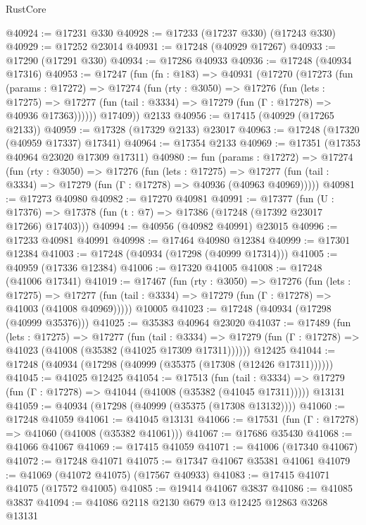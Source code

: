 \begin{lexlean}{RustCore}
\begin{coremodule}
@40924 := @17231 @330
@40928 := @17233 (@17237 @330) (@17243 @330)
@40929 := @17252 @23014
@40931 := @17248 (@40929 @17267)
@40933 := @17290 (@17291 @330)
@40934 := @17286 @40933
@40936 := @17248 (@40934 @17316)
@40953 := @17247
    (fun (fn : @183) =>
    @40931
      (@17270
        (@17273
          (fun (params : @17272) =>
          @17274
            (fun (rty : @3050) =>
            @17276
              (fun (lets : @17275) =>
              @17277 (fun (tail : @3334) => @17279 (fun (Γ : @17278) => @40936 @17363))))))
        @17409))
    @2133
@40956 := @17415 (@40929 (@17265 @2133))
@40959 := @17328 (@17329 @2133) @23017
@40963 := @17248 (@17320 (@40959 @17337) @17341)
@40964 := @17354 @2133
@40969 := @17351 (@17353 @40964 @23020 @17309 @17311)
@40980 := fun (params : @17272) =>
  @17274
    (fun (rty : @3050) =>
    @17276
      (fun (lets : @17275) =>
      @17277 (fun (tail : @3334) => @17279 (fun (Γ : @17278) => @40936 (@40963 @40969)))))
@40981 := @17273 @40980
@40982 := @17270 @40981
@40991 := @17377
    (fun (U : @17376) => @17378 (fun (t : @7) => @17386 (@17248 (@17392 @23017 @17266) @17403)))
@40994 := @40956 (@40982 @40991) @23015
@40996 := @17233 @40981 @40991
@40998 := @17464 @40980 @12384
@40999 := @17301 @12384
@41003 := @17248 (@40934 (@17298 (@40999 @17314)))
@41005 := @40959 (@17336 @12384)
@41006 := @17320 @41005
@41008 := @17248 (@41006 @17341)
@41019 := @17467
    (fun (rty : @3050) =>
    @17276
      (fun (lets : @17275) =>
      @17277 (fun (tail : @3334) => @17279 (fun (Γ : @17278) => @41003 (@41008 @40969)))))
    @10005
@41023 := @17248 (@40934 (@17298 (@40999 @35376)))
@41025 := @35383 @40964 @23020
@41037 := @17489
    (fun (lets : @17275) =>
    @17277
      (fun (tail : @3334) =>
      @17279 (fun (Γ : @17278) => @41023 (@41008 (@35382 (@41025 @17309 @17311))))))
    @12425
@41044 := @17248 (@40934 (@17298 (@40999 (@35375 (@17308 (@12426 @17311))))))
@41045 := @41025 @12425
@41054 := @17513
    (fun (tail : @3334) => @17279 (fun (Γ : @17278) => @41044 (@41008 (@35382 (@41045 @17311)))))
    @13131
@41059 := @40934 (@17298 (@40999 (@35375 (@17308 @13132))))
@41060 := @17248 @41059
@41061 := @41045 @13131
@41066 := @17531 (fun (Γ : @17278) => @41060 (@41008 (@35382 @41061)))
@41067 := @17686 @35430
@41068 := @41066 @41067
@41069 := @17415 @41059
@41071 := @41006 (@17340 @41067)
@41072 := @17248 @41071
@41075 := @17347 @41067 @35381 @41061
@41079 := @41069 (@41072 @41075) (@17567 @40933)
@41083 := @17415 @41071 @41075 (@17572 @41005)
@41085 := @19414 @41067 @3837
@41086 := @41085 @3837
@41094 := @41086 @2118 @2130 @679 @13 @12425 @12863 @3268 @13131

\end{coremodule}
\end{lexlean}

